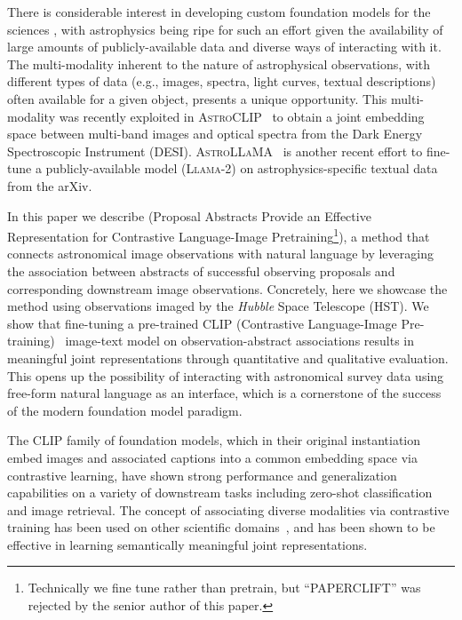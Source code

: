 \documentclass[10pt]{article} %
\newcommand{\hubble}{\emph{Hubble}\xspace}
\begin{document}
There is considerable interest in developing custom foundation models for the sciences \citep[e.g., ][]{batatia2023foundation,subramanian2023towards}, with astrophysics being ripe for such an effort given the availability of large amounts of publicly-available data and diverse ways of interacting with it.
%
The multi-modality inherent to the nature of astrophysical observations, with different types of data (e.g., images, spectra, light curves, textual descriptions) often available for a given object, presents a unique opportunity.
%
This multi-modality was recently exploited in \textsc{AstroCLIP}~\citep{lanusse2023astroclip} to obtain a joint embedding space between multi-band images and optical spectra from the Dark Energy Spectroscopic Instrument (DESI).
%
\textsc{AstroLLaMA}~\citep{nguyen2023astrollama,perkowski2024astrollama} is another recent effort to fine-tune a publicly-available model (\textsc{Llama-2}) on astrophysics-specific textual data from the arXiv.

In this paper we describe  (Proposal Abstracts Provide an Effective Representation for Contrastive Language-Image Pretraining\footnote{Technically we fine tune rather than pretrain, but ``PAPERCLIFT'' was rejected by the senior author of this paper.}), a method that connects astronomical image observations with natural language by leveraging the association between abstracts of successful observing proposals and corresponding downstream image observations. 
%
Concretely, here we showcase the method using observations imaged by the \hubble Space Telescope (HST).
%
We show that fine-tuning a pre-trained CLIP (Contrastive Language-Image Pre-training)~\cite{radford2021learning} image-text model on observation-abstract associations results in meaningful joint representations through quantitative and qualitative evaluation.
%
This opens up the possibility of interacting with astronomical survey data using free-form natural language as an interface, which is a cornerstone of the success of the modern foundation model paradigm.
%

The CLIP family of foundation models, which in their original instantiation embed images and associated captions into a common embedding space via contrastive learning, have shown strong performance and generalization capabilities on a variety of downstream tasks including zero-shot classification and image retrieval.
%
The concept of associating diverse modalities via contrastive training has been used on other scientific domains~\citep[e.g.,][]{liu2023text,Sanchez-Fernandez2022.11.17.516915,lanusse2023astroclip,cepeda2023geoclip}, and has been shown to be effective in learning semantically meaningful joint representations.
\end{document}
